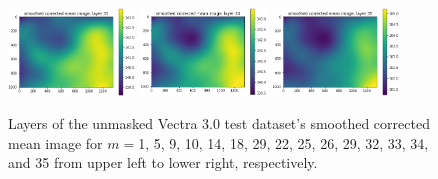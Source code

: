 \documentclass[letterpaper,11pt]{article}
\begin{document}
\begin{figure}[!ht]
\includegraphics[width=0.3\textwidth]{images/results/unmasked_smoothed_corrected_mean_image_layers_vectra/unmasked_smoothed_corrected_mean_image_layer_33}
\includegraphics[width=0.3\textwidth]{images/results/unmasked_smoothed_corrected_mean_image_layers_vectra/unmasked_smoothed_corrected_mean_image_layer_34}
\includegraphics[width=0.3\textwidth]{images/results/unmasked_smoothed_corrected_mean_image_layers_vectra/unmasked_smoothed_corrected_mean_image_layer_35}
\caption{\footnotesize Layers of the unmasked Vectra 3.0 test dataset's smoothed corrected mean image for $m=$1, 5, 9, 10, 14, 18, 29, 22, 25, 26, 29, 32, 33, 34, and 35 from upper left to lower right, respectively.}
\label{fig:unmasked_smoothed_corrected_mean_image_layers_vectra}
\end{figure}
\end{document}
